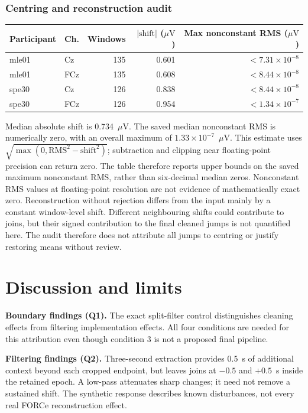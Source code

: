 \documentclass[11pt,a4paper]{article}
\newcommand{\uv}{\ensuremath{\mu\mathrm{V}}}
\begin{document}
\subsubsection{Centring and reconstruction audit}
\begin{center}\small\begin{tabular}{llrrr}\toprule
Participant & Ch. & Windows & $|\mathrm{shift}|$ (\uv) & Max nonconstant RMS (\uv) \\
\midrule
mle01 & Cz & 135 & 0.601 & $<7.31\times10^{-8}$ \\
mle01 & FCz & 135 & 0.608 & $<8.44\times10^{-8}$ \\
spe30 & Cz & 126 & 0.838 & $<8.44\times10^{-8}$ \\
spe30 & FCz & 126 & 0.954 & $<1.34\times10^{-7}$ \\
\bottomrule\end{tabular}\end{center}
Median absolute shift is 0.734~\uv. The saved median nonconstant RMS is numerically zero, with an overall maximum of $1.33\times10^{-7}$~\uv. This estimate uses $\sqrt{\max(0,\mathrm{RMS}^2-\mathrm{shift}^2)}$; subtraction and clipping near floating-point precision can return zero. The table therefore reports upper bounds on the saved maximum nonconstant RMS, rather than six-decimal median zeros. Nonconstant RMS values at floating-point resolution are not evidence of mathematically exact zero. Reconstruction without rejection differs from the input mainly by a constant window-level shift. Different neighbouring shifts could contribute to joins, but their signed contribution to the final cleaned jumps is not quantified here. The audit therefore does not attribute all jumps to centring or justify restoring means without review.
\section{Discussion and limits}
\textbf{Boundary findings (Q1).} The exact split-filter control distinguishes cleaning effects from filtering implementation effects. All four conditions are needed for this attribution even though condition 3 is not a proposed final pipeline.


\textbf{Filtering findings (Q2).} Three-second extraction provides 0.5~s of additional context beyond each cropped endpoint, but leaves joins at $-0.5$ and $+0.5$~s inside the retained epoch. A low-pass attenuates sharp changes; it need not remove a sustained shift. The synthetic response describes known disturbances, not every real FORCe reconstruction effect.
\end{document}
